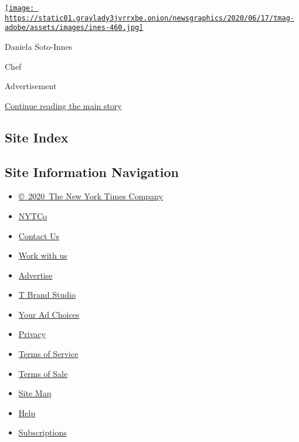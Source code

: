 \href{https://www.nytimes3xbfgragh.onion/2020/08/10/t-magazine/daniela-soto-innes-cooking-chef.html}{\texttt{[image: https://static01.graylady3jvrrxbe.onion/newsgraphics/2020/06/17/tmag-adobe/assets/images/ines-460.jpg]}}

Daniela Soto-Innes

Chef

Advertisement

\protect\hyperlink{after-bottom}{Continue reading the main story}

\hypertarget{site-index}{%
\subsection{Site Index}\label{site-index}}

\hypertarget{site-information-navigation}{%
\subsection{Site Information
Navigation}\label{site-information-navigation}}

\begin{itemize}
\tightlist
\item
  \href{https://help.nytimes3xbfgragh.onion/hc/en-us/articles/115014792127-Copyright-notice}{©~2020~The
  New York Times Company}
\end{itemize}

\begin{itemize}
\tightlist
\item
  \href{https://www.nytco.com/}{NYTCo}
\item
  \href{https://help.nytimes3xbfgragh.onion/hc/en-us/articles/115015385887-Contact-Us}{Contact
  Us}
\item
  \href{https://www.nytco.com/careers/}{Work with us}
\item
  \href{https://nytmediakit.com/}{Advertise}
\item
  \href{http://www.tbrandstudio.com/}{T Brand Studio}
\item
  \href{https://www.nytimes3xbfgragh.onion/privacy/cookie-policy\#how-do-i-manage-trackers}{Your
  Ad Choices}
\item
  \href{https://www.nytimes3xbfgragh.onion/privacy}{Privacy}
\item
  \href{https://help.nytimes3xbfgragh.onion/hc/en-us/articles/115014893428-Terms-of-service}{Terms
  of Service}
\item
  \href{https://help.nytimes3xbfgragh.onion/hc/en-us/articles/115014893968-Terms-of-sale}{Terms
  of Sale}
\item
  \href{https://spiderbites.nytimes3xbfgragh.onion}{Site Map}
\item
  \href{https://help.nytimes3xbfgragh.onion/hc/en-us}{Help}
\item
  \href{https://www.nytimes3xbfgragh.onion/subscription?campaignId=37WXW}{Subscriptions}
\end{itemize}
